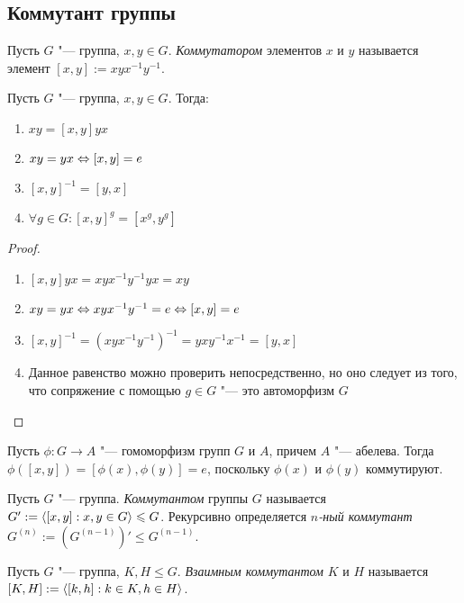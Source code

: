 \subsection{Коммутант группы}

\begin{definition}
	Пусть $G$ "--- группа, $x, y \in G$. \textit{Коммутатором} элементов $x$ и $y$ называется элемент $[x, y] := xyx^{-1}y^{-1}$.
\end{definition}

\begin{proposition} Пусть $G$ "--- группа, $x, y \in G$. Тогда:
	\begin{enumerate}
		\item $xy = [x, y]yx$
		\item $xy = yx \Leftrightarrow [x, y] = e$
		\item $[x, y]^{-1} = [y, x]$
		\item $\forall g \in G: [x, y]^g = [x^g, y^g]$ 
	\end{enumerate}
\end{proposition}

\begin{proof}~
	\begin{enumerate}
		\item $[x, y]yx = xyx^{-1}y^{-1}yx = xy$
		\item $xy = yx \Leftrightarrow xyx^{-1}y^{-1} = e \Leftrightarrow [x, y] = e$
		\item $[x, y]^{-1} = (xyx^{-1}y^{-1})^{-1} = yxy^{-1}x^{-1} = [y, x]$
		\item Данное равенство можно проверить непосредственно, но оно следует из того, что сопряжение с помощью $g \in G$ "--- это автоморфизм $G$
	\end{enumerate}
\end{proof}

\begin{note}
	Пусть $\phi : G \to A$ "--- гомоморфизм групп $G$ и $A$, причем $A$ "--- абелева. Тогда $\phi([x, y]) = [\phi(x), \phi(y)] = e$, поскольку $\phi(x)$ и $\phi(y)$ коммутируют.
\end{note}

\begin{definition}
	Пусть $G$ "--- группа. \textit{Коммутантом} группы $G$ называется $G' := \langle[x, y]: x, y \in G\rangle \leqslant G$. Рекурсивно определяется \textit{$n$-ный коммутант} $G^{(n)} := (G^{(n - 1)})' \le G^{(n - 1)}$.
\end{definition}

\begin{definition}
	Пусть $G$ "--- группа, $K, H \le G$. \textit{Взаимным коммутантом} $K$ и $H$ называется $[K, H] := \langle[k, h]: k \in K,  h \in H\rangle$.
\end{definition}


